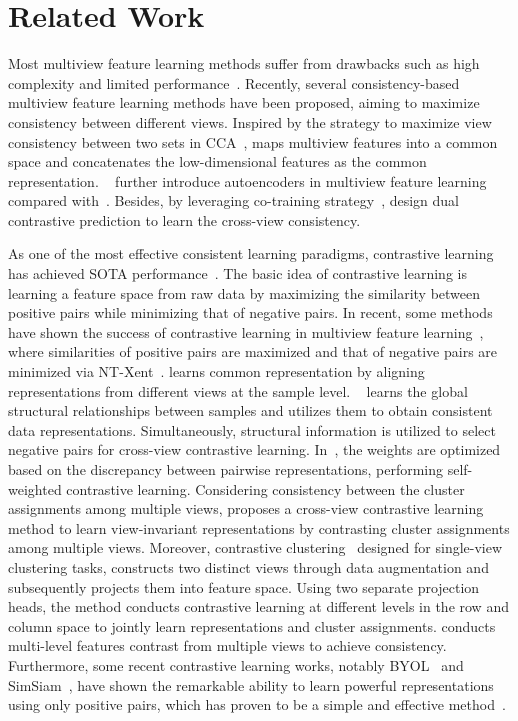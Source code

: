 \section{Related Work}
Most multiview feature learning methods suffer from drawbacks such as high complexity and limited performance~\cite{chen2021multiview,zhan2018multiview,ijcai2019p510,liu2020efficient}. Recently, several consistency-based multiview feature learning methods have been proposed, aiming to maximize consistency between different views. Inspired by the strategy to maximize view consistency between two sets in CCA~\cite{hotelling1936relations}, \cite{andrew2013deep} maps multiview features into a common space and concatenates the low-dimensional features as the common representation. ~\cite{wang2015deep} further introduce autoencoders in multiview feature learning compared with~\cite{andrew2013deep}.
Besides, by leveraging co-training strategy~\cite{blum1998combining}, \cite{Lin2022} design dual contrastive prediction to learn the cross-view consistency.

As one of the most effective consistent learning paradigms, contrastive learning has achieved SOTA performance~\cite{chen2020simple,he2020momentum}. The basic idea of contrastive learning is learning a feature space from raw data by maximizing the similarity between positive pairs while minimizing that of negative pairs. In recent, some methods have shown the success of contrastive learning in multiview feature learning~\cite{trostenMVC,Xu_2022_CVPR}, where similarities of positive pairs are maximized and that of negative pairs are minimized via NT-Xent~\cite{chen2020simple}. \cite{trostenMVC} learns common representation by aligning representations from different views at the sample level. ~\cite{yan2023gcfagg} learns the global structural relationships between samples and utilizes them to obtain consistent data representations. Simultaneously, structural information is utilized to select negative pairs for cross-view contrastive learning. In~\cite{xu2024self}, the weights are optimized based on the discrepancy between pairwise representations, performing self-weighted contrastive learning. Considering consistency between the cluster assignments among multiple views, \cite{chen2023deep} proposes a cross-view contrastive learning method to learn view-invariant representations by contrasting cluster assignments among multiple views. Moreover, contrastive clustering~\cite{li2021contrastive} designed for single-view clustering tasks, constructs two distinct views through data augmentation and subsequently projects them into feature space. Using two separate projection heads, the method conducts contrastive learning at different levels in the row and column space to jointly learn representations and cluster assignments. \cite{Xu_2022_CVPR} conducts multi-level features contrast from multiple views to achieve consistency. Furthermore, some recent contrastive learning works, notably BYOL~\cite{grill2020bootstrap} and SimSiam~\cite{chen2021exploring}, have shown the remarkable ability to learn powerful representations using only positive pairs, which has proven to be a simple and effective method~\cite{Tian2021}.